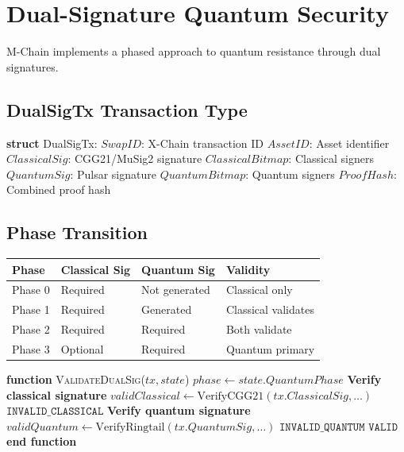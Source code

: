 \section{Dual-Signature Quantum Security}


M-Chain implements a phased approach to quantum resistance through dual signatures.

\subsection{DualSigTx Transaction Type}



\begin{algorithmic}[1]
\State \textbf{struct} DualSigTx:
\State \quad $SwapID$: X-Chain transaction ID
\State \quad $AssetID$: Asset identifier
\State \quad $ClassicalSig$: CGG21/MuSig2 signature
\State \quad $ClassicalBitmap$: Classical signers
\State \quad $QuantumSig$: Pulsar signature
\State \quad $QuantumBitmap$: Quantum signers
\State \quad $ProofHash$: Combined proof hash
\end{algorithmic}


\subsection{Phase Transition}

\begin{table}[h]
\centering
\begin{tabular}{@{}llll@{}}
\toprule
\textbf{Phase} & \textbf{Classical Sig} & \textbf{Quantum Sig} & \textbf{Validity} \\
\midrule
Phase 0 & Required & Not generated & Classical only \\
Phase 1 & Required & Generated & Classical validates \\
Phase 2 & Required & Required & Both validate \\
Phase 3 & Optional & Required & Quantum primary \\
\bottomrule
\end{tabular}

\label{tab:quantum-phases}
\end{table}



\begin{algorithmic}[1]
\State \textbf{function} \textsc{ValidateDualSig}($tx, state$)
    \State $phase \gets state.QuantumPhase$
    \State
        \State \textbf{Verify classical signature}
        \State $validClassical \gets \text{VerifyCGG21}(tx.ClassicalSig, \ldots)$
            \State \Return $\texttt{INVALID\_CLASSICAL}$
        \EndIf
    \EndIf
    \State
        \State \textbf{Verify quantum signature}
        \State $validQuantum \gets \text{VerifyRingtail}(tx.QuantumSig, \ldots)$
            \State \Return $\texttt{INVALID\_QUANTUM}$
        \EndIf
    \EndIf
    \State
    \State \Return $\texttt{VALID}$
\State \textbf{end function}
\end{algorithmic}


